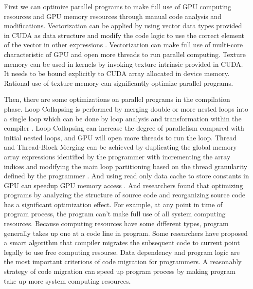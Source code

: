 \documentclass[10pt,conference]{IEEEtran}
\begin{document}
First we can optimize parallel programs to make full use of GPU computing resources and GPU memory resources through manual code analysis and modifications. Vectorization can be applied by using vector data types provided in CUDA as data structure and modify the code logic to use the correct element of the vector in other expressions \cite{IEEEhowto:4}\cite{IEEEhowto:16}. Vectorization can make full use of multi-core characteristic of GPU and open more threads to run parallel computing. Texture memory can be used in kernels by invoking texture intrinsic provided in CUDA\cite{IEEEhowto:19}. It needs to be bound explicitly to CUDA array allocated in device memory. Rational use of texture memory can significantly optimize parallel programs.

Then, there are some optimizations on parallel programs in the compilation phase. Loop Collapsing is performed by merging double or more nested loops into a single loop which can be done by loop analysis and transformation within the compiler \cite{IEEEhowto:4}\cite{IEEEhowto:17}. Loop Collapsing can increase the degree of parallelism compared with initial nested loops, and GPU will open more threads to run the loop. Thread and Thread-Block Merging can be achieved by duplicating the global memory array expressions identified by the programmer with incrementing the array indices and modifying the main loop partitioning based on the thread granularity defined by the programmer \cite{IEEEhowto:4}. And using read only data cache to store constants in GPU can speedup GPU memory access \cite{IEEEhowto:3}. And researchers found that optimizing programs by analyzing the structure of source code and reorganizing source code has a significant optimization effect. For example, at any point in time of program process, the program can't make full use of all system computing resources\cite{IEEEhowto:20}. Because computing resources have some different types, program generally takes up one at a code line in program. Some researchers have proposed a smart algorithm that compiler migrates the subsequent code to current point legally to use free computing resourse. Data dependency and program logic are the most important criterions of code migration for programmers. A reasonably strategy of code migration can speed up program process by making program take up more system computing resources.
\end{document}

